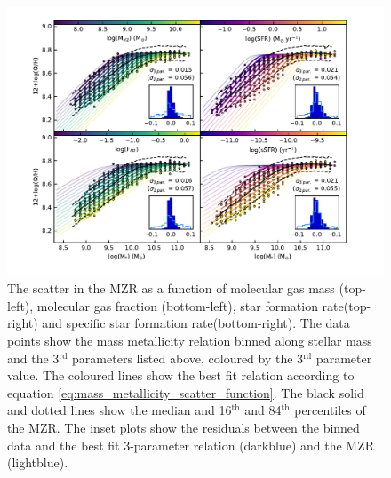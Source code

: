 \documentclass[fleqn,usenatbib]{mnras}
\begin{document}
\begin{figure}
    \centering
    \includegraphics[width=2\columnwidth]{figures/fig11.pdf}
    \caption{The scatter in the MZR as a function of molecular gas mass (top-left), molecular gas fraction (bottom-left), star formation rate(top-right) and specific star formation rate(bottom-right). The data points show the mass metallicity relation binned along stellar mass and the 3$^{\textrm{rd}}$ parameters listed above, coloured by the 3$^{\textrm{rd}}$ parameter value. The coloured lines show the best fit relation according to equation \ref{eq:mass_metallicity_scatter_function}. The black solid and dotted lines show the median and 16$^{\textrm{th}}$ and 84$^{\textrm{th}}$ percentiles of the MZR. The inset plots show the residuals between the binned data and the best fit 3-parameter relation (darkblue) and the MZR (lightblue).}
    \label{fig:MZR_binned}
\end{figure}
\end{document}
